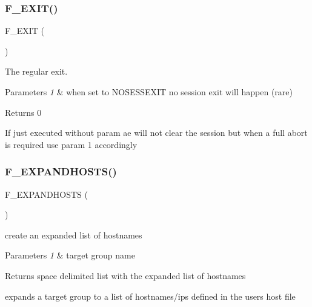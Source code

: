\subsubsection{\texorpdfstring{F\+\_\+\+E\+X\+I\+T()}{F\_EXIT()}}
{\footnotesize\ttfamily F\+\_\+\+E\+X\+IT (\begin{DoxyParamCaption}\item[{1}]{ }\end{DoxyParamCaption})}



The regular exit. 


\begin{DoxyParams}{Parameters}
{\em 1} & when set to \textquotesingle{}N\+O\+S\+E\+S\+S\+E\+X\+IT\textquotesingle{} no session exit will happen (rare) \\
\hline
\end{DoxyParams}
\begin{DoxyReturn}{Returns}
0
\end{DoxyReturn}
If just executed without param ae will not clear the session but when a full abort is required use param 1 accordingly \mbox{\label{ansible__engine_8sh_a8233577ab4c7a9a7be584c90aea71749}} 
\subsubsection{\texorpdfstring{F\+\_\+\+E\+X\+P\+A\+N\+D\+H\+O\+S\+T\+S()}{F\_EXPANDHOSTS()}}
{\footnotesize\ttfamily F\+\_\+\+E\+X\+P\+A\+N\+D\+H\+O\+S\+TS (\begin{DoxyParamCaption}\item[{1}]{ }\end{DoxyParamCaption})}



create an expanded list of hostnames 


\begin{DoxyParams}{Parameters}
{\em 1} & target group name \\
\hline
\end{DoxyParams}
\begin{DoxyReturn}{Returns}
space delimited list with the expanded list of hostnames
\end{DoxyReturn}
expands a target group to a list of hostnames/ips defined in the users host file \mbox{\label{ansible__engine_8sh_a9568fd1ead2b71b897b08920e10845a5}} 
